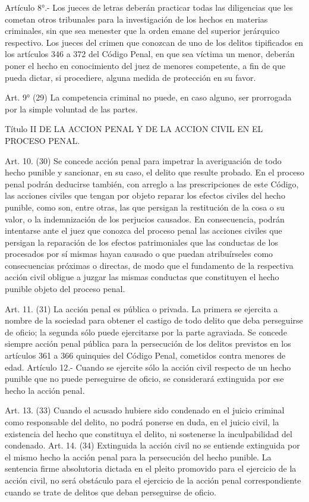     Artículo 8°.- Los jueces de letras deberán practicar todas las diligencias que les cometan otros tribunales para la investigación de los hechos en materias criminales, sin que sea menester que la orden emane del superior jerárquico respectivo.
    Los jueces del crimen que conozcan de uno de los delitos tipificados en los artículos 346 a 372 del Código Penal, en que sea víctima un menor, deberán poner el hecho en conocimiento del juez de menores competente, a fin de que pueda dictar, si procediere, alguna medida de protección en su favor.

    Art. 9° (29) La competencia criminal no puede, en caso alguno, ser prorrogada por la simple voluntad de las partes.


  Título II
  DE LA ACCION PENAL Y DE LA ACCION CIVIL EN EL
  PROCESO PENAL.


    Art. 10. (30) Se concede acción penal para impetrar la averiguación de todo hecho punible y sancionar, en su caso, el delito que resulte probado. En el proceso penal podrán deducirse también, con arreglo a las prescripciones de este Código, las acciones civiles que tengan por objeto reparar los efectos civiles del hecho punible, como son, entre otras, las que persigan la restitución de la cosa o su valor, o la indemnización de los perjucios causados.
    En consecuencia, podrán intentarse ante el juez que conozca del proceso penal las acciones civiles que persigan la reparación de los efectos patrimoniales que las conductas de los procesados por sí mismas hayan causado o que puedan atribuírseles como consecuencias próximas o directas, de modo que el fundamento de la respectiva acción civil obligue a juzgar las mismas conductas que constituyen el hecho punible objeto del proceso penal.

    Art. 11. (31) La acción penal es pública o privada. La primera se ejercita a nombre de la sociedad para obtener el castigo de todo delito que deba perseguirse de oficio; la segunda sólo puede ejercitarse por la parte agraviada.
    Se concede siempre acción penal pública para la persecución de los delitos previstos en los artículos 361 a 366 quinquies del Código Penal, cometidos contra menores de edad.
    Artículo 12.- Cuando se ejercite sólo la acción civil respecto de un hecho punible que no puede perseguirse de oficio, se considerará extinguida por ese hecho la acción penal.

    Art. 13. (33) Cuando el acusado hubiere sido condenado en el juicio criminal como responsable del delito, no podrá ponerse en duda, en el juicio civil, la existencia del hecho que constituya el delito, ni sostenerse la inculpabilidad del condenado.
    Art. 14. (34) Extinguida la acción civil no se entiende extinguida por el mismo hecho la acción penal para la persecución del hecho punible.
    La sentencia firme absolutoria dictada en el pleito promovido para el ejercicio de la acción civil, no será obstáculo para el ejercicio de la acción penal correspondiente cuando se trate de delitos que deban perseguirse de oficio.

